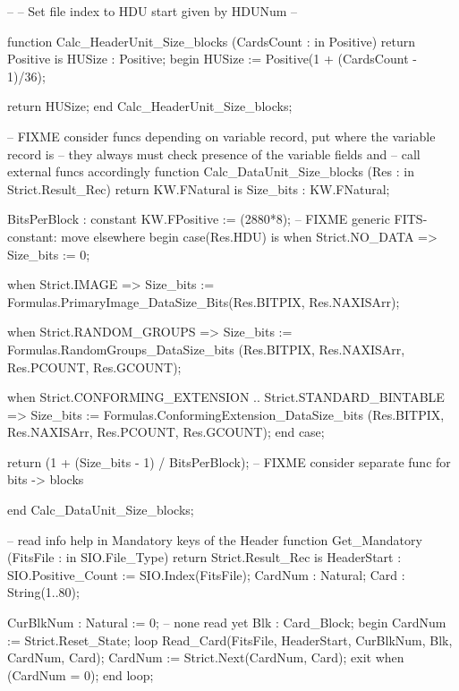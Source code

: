    --
   -- Set file index to HDU start given by HDUNum
   --



        function  Calc_HeaderUnit_Size_blocks
                (CardsCount : in Positive) 
                return Positive
        is
                HUSize : Positive;
        begin 
                HUSize := Positive(1 + (CardsCount - 1)/36);

                return HUSize;
        end Calc_HeaderUnit_Size_blocks;


        -- FIXME consider funcs depending on variable record, put where the variable record is
        -- they always must check presence of the variable fields and 
        -- call external funcs accordingly
function  Calc_DataUnit_Size_blocks  
                (Res : in Strict.Result_Rec) return KW.FNatural
is
	Size_bits : KW.FNatural;

	BitsPerBlock : constant KW.FPositive := (2880*8);
		-- FIXME generic FITS-constant: move elsewhere
begin
	case(Res.HDU) is
	when Strict.NO_DATA =>
		Size_bits := 0;

	when Strict.IMAGE =>
		Size_bits := Formulas.PrimaryImage_DataSize_Bits(Res.BITPIX, Res.NAXISArr);

	when Strict.RANDOM_GROUPS =>
		Size_bits := Formulas.RandomGroups_DataSize_bits
                 		(Res.BITPIX, Res.NAXISArr,
                  		Res.PCOUNT, Res.GCOUNT);

	when Strict.CONFORMING_EXTENSION .. Strict.STANDARD_BINTABLE =>
		Size_bits := Formulas.ConformingExtension_DataSize_bits
                 		(Res.BITPIX, Res.NAXISArr,
                  		Res.PCOUNT, Res.GCOUNT);
	end case;

	return (1 + (Size_bits - 1) / BitsPerBlock); 
		-- FIXME consider separate func for bits -> blocks

end  Calc_DataUnit_Size_blocks;






-- read info help in Mandatory keys of the Header
  function  Get_Mandatory (FitsFile : in SIO.File_Type) return Strict.Result_Rec
  is
		HeaderStart : SIO.Positive_Count := SIO.Index(FitsFile);	
                CardNum : Natural;
                Card : String(1..80);

                CurBlkNum : Natural := 0; -- none read yet
                Blk : Card_Block;
   begin
                CardNum := Strict.Reset_State;
                loop
                        Read_Card(FitsFile, HeaderStart, CurBlkNum, Blk, CardNum, Card);
                        CardNum := Strict.Next(CardNum, Card);
                        exit when (CardNum = 0); 
                end loop;

